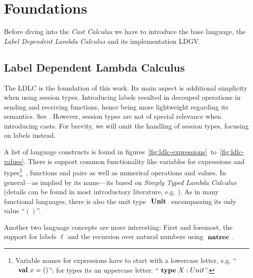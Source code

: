 \newcommand{\letb}{\text{ \textbf{let} }}
\newcommand{\inb}{\text{ \textbf{in} }}
\newcommand{\rec}{\text{ \textbf{rec} }}
\newcommand{\natrec}{\text{ \textbf{natrec} }}
\newcommand{\fstb}{\text{ \textbf{fst} }}
\newcommand{\sndb}{\text{ \textbf{snd} }}

\newcommand{\Unit}{\text{ \textbf{Unit} }}
\newcommand{\Nat}{\text{ \textbf{Nat} }}
\newcommand{\Double}{\text{ \textbf{Double} }}
\newcommand{\Bot}{\text{ \textbf{Bot} }}

\newcommand{\valb}{\text{ \textbf{val} }}
\newcommand{\typeb}{\text{ \textbf{type} }}

\chapter{Foundations}\label{chap:foundations}

Before diving into the \emph{Cast Calculus} we have to introduce the base language, the \emph{Label Dependent Lambda Calculus} and its implementation LDGV.

\section{Label Dependent Lambda Calculus}

The LDLC is the foundation of this work. Its main aspect is additional simplicity when using session types. Introducing labels resulted in decouped operations in sending and receiving functions, hence being more lightweight regarding its semantics. See \cite{thiemann2019}. However, session types are not of special relevance when introducing casts. For brevity, we will omit the handling of session types, focusing on labels instead.

A list of language constructs is found in figures~\ref{fig:ldlc-expressions}~to~\ref{fig:ldlc-values}. There is support common functionality like variables  for expressions and types\footnote{
Variable names for expressions have to start with a lowercase letter, e.g. ``$\valb x = ()$''; for types its an uppercase letter: ``$\typeb X : Unit$''.}\
, functions and pairs as well as numerical operations and values. In general---as implied by its name---its based on \emph{Simply Typed Lambda Calculus} (details can be found in most introductory literature, e.g. \cite{pierce2002}). As in many functional languages, there is also the unit type $\Unit$ encompassing its only value ``$()$''.

Another two language concepts are more interesting: First and foremost, the support for labels $\ell$ and the recursion over natural numbers using $\natrec$.

